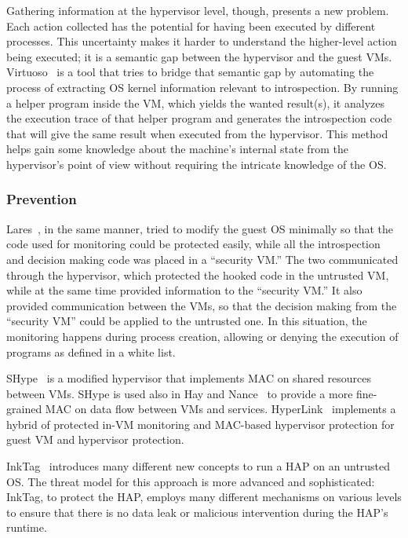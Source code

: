 \par Gathering information at the hypervisor level, though, presents a new problem. Each action collected has the potential for having been executed by different processes. This uncertainty makes it harder to understand the higher-level action being executed; it is a semantic gap between the hypervisor and the guest \ac{VM}s. Virtuoso~\cite{dolan2011virtuoso} is a tool that tries to bridge that semantic gap by automating the process of extracting \ac{OS} kernel information relevant to introspection. By running a helper program inside the \ac{VM}, which yields the wanted result(s), it analyzes the execution trace of that helper program and generates the introspection code that will give the same result when executed from the hypervisor. This method helps gain some knowledge about the machine's internal state from the hypervisor’s point of view without requiring the intricate knowledge of the \ac{OS}. 

\subsubsection{Prevention}

Lares~\cite{payne2008lares}, in the same manner, tried to modify the guest \ac{OS} minimally so that the code used for monitoring could be protected easily, while all the introspection and decision making code was placed in a ``security \ac{VM}.'' The two communicated through the hypervisor, which protected the hooked code in the untrusted \ac{VM}, while at the same time provided information to the ``security \ac{VM}.'' It also provided communication between the \ac{VM}s, so that the decision making from the ``security \ac{VM}'' could be applied to the untrusted one. In this situation, the monitoring happens during process creation, allowing or denying the execution of programs as defined in a white list.

\par SHype~\cite{sailer2005building} is a modified hypervisor that implements \ac{MAC} on shared resources between \ac{VM}s. SHype is used also in Hay and Nance~\cite{hay2008forensics} to provide a more fine-grained \ac{MAC} on data flow between \ac{VM}s and services. HyperLink~\cite{xiao2016hyperlink} implements a hybrid of protected in-\ac{VM} monitoring and \ac{MAC}-based hypervisor protection for guest \ac{VM} and hypervisor protection.

\par InkTag~\cite{hofmann2013inktag} introduces many different new concepts to run a \ac{HAP} on an untrusted \ac{OS}. The threat model for this approach is more advanced and sophisticated: InkTag, to protect the \ac{HAP}, employs many different mechanisms on various levels to ensure that there is no data leak or malicious intervention during the \ac{HAP}'s runtime. 

